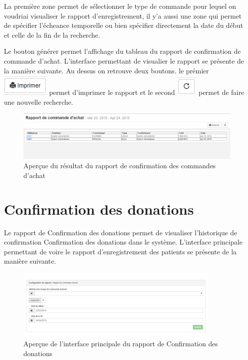 \documentclass[12pt,a4paper]{report}
\begin{document}
La première zone permet de sélectionner le type de commande pour lequel on voudriai visualiser le rapport d'enregistrement, il y'a aussi une zone qui permet de spécifier l'écheance temporelle  ou bien spécifier directement la date du début et celle de la fin de la recherche. 

Le bouton générer permet l'affichage du tableau du rapport de confirmation de commande d'achat. L'interface permettant de visualier le rapport se présente de la manière suivante. Au dessus on retrouve deux boutons. le prémier 
\includegraphics[scale=0.7]{pic/Print.png} permet d'imprimer le rapport et le second \includegraphics[scale=0.7]{pic/refresh.png} permet de faire une nouvelle recherche.

\begin{figure}[h]
\begin{center}
\includegraphics[width=12cm]{pic/RapportCommAchat.png}
\end{center}
\caption{Aperçue du résultat du rapport de confirmation des commandes d'achat}
\label{Aperçue du résultat du rapport de confirmation des commandes d'achat}
\end{figure}

\newpage
\section{Confirmation des donations}
Le rapport de Confirmation des donations permet de visualiser l'historique de confirmation Confirmation des donations dans le système. L'interface principale permettant de voire le rapport d'enregistrement des patients se présente de la manière suivante. 

\begin{figure}[h]
\begin{center}
\includegraphics[width=10cm]{pic/RapConfPO.png}
\end{center}
\caption{Aperçue de l'interface principale du rapport de Confirmation des donations}
\label{Aperçue de l'interface principale du rapport de Confirmation des donations}
\end{figure}
\end{document}

